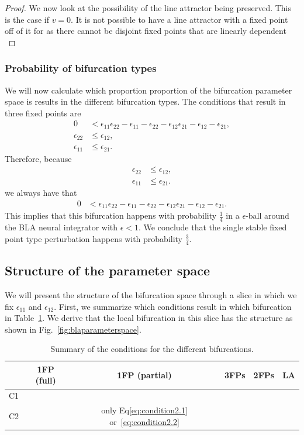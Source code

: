 \documentclass{article} %
\newcounter{ct}
\newcommand{\cmark}{\ding{51}}%
\newcommand{\xmark}{\ding{55}}%
\theoremstyle{definition}
\theoremstyle{remark}
\begin{document}
\begin{proof}
We now look at the possibility of the line attractor being preserved.
This is the case if \(v=0\).
It is not possible to have a line attractor with a fixed point off of it for as there cannot be disjoint fixed points that are linearly dependent \citep[Lemma 5.2]{morrison2024diversity}
\end{proof}




\subsubsection{Probability of bifurcation types}\label{sec:supp:probbla}
We will now calculate which proportion proportion of the bifurcation parameter space is results in the different bifurcation types.
The conditions  that result in three fixed points are
\begin{align*}
0 &< \epsilon_{11}\epsilon_{22}-\epsilon_{11}-\epsilon_{22}-\epsilon_{12}\epsilon_{21}-\epsilon_{12}-\epsilon_{21},\\
\epsilon_{22} &\leq \epsilon_{12},\\
\epsilon_{11} &\leq \epsilon_{21}.
\end{align*}
Therefore, because
\begin{align*}
\epsilon_{22} &\leq \epsilon_{12},\\
\epsilon_{11} &\leq \epsilon_{21}.
\end{align*}
we always have that
\begin{align*}
0 &< \epsilon_{11}\epsilon_{22}-\epsilon_{11}-\epsilon_{22}-\epsilon_{12}\epsilon_{21}-\epsilon_{12}-\epsilon_{21}.
\end{align*}
This implies that this bifurcation happens with probability \(\frac{1}{4}\)  in a \(\epsilon\)-ball around the BLA neural integrator with \(\epsilon<1\).
We conclude that the single stable fixed point type perturbation happens with probability \(\frac{3}{4}\).


\subsection{Structure of the parameter space}
We will present the structure of the bifurcation space through a slice in which we fix  \(\epsilon_{11}\) and \(\epsilon_{12}\).
First, we summarize which conditions result in which bifurcation in Table~\ref{tab:bifs}.
We derive that the local bifurcation in this slice  has the structure as shown in Fig.~\ref{fig:blaparameterspace}.
\begin{table}[H]
\caption{Summary of the conditions for the different bifurcations.}\label{tab:bifs}
\centering
\bgroup
\def\arraystretch{1.52}
\begin{tabular}{|c||c|c|c|c|c|}
\hline
& 1FP (full) 		& 1FP (partial) & 3FPs & 2FPs & LA  \\\hline \hline
C1 & \cmark	 	& \xmark 	 & \cmark & \xmark & \xmark \\\hline
C2 & \xmark 		& only Eq\ref{eq:condition2.1} or~\ref{eq:condition2.2}  	 & \cmark & \cmark& \xmark \\\hline
\end{tabular}
\egroup
\end{table}
\end{document}
